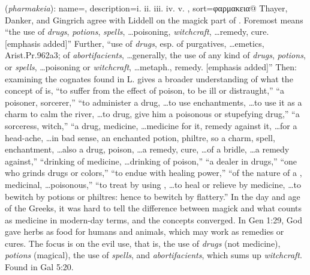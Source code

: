\item[Witchcraft (use of),]

(\textit{pharmakeia}):
{
    name=,
    description={i.  ii.  iii.  iv.  v. },
    sort=φαρμακεια@
}
Thayer, Danker, and Gingrich agree with Liddell on the magick part of . 
Foremost  means ``the use of \emph{drugs}, \emph{potions}, \emph{spells}, \ldots poisoning, \emph{witchcraft}, \ldots remedy, cure. [emphasis added]''
Further, ``use of \emph{drugs}, esp. of purgatives, \ldots emetics, Arist.Pr.962a3; of \emph{abortifacients}, \ldots generally, the use of any kind of \emph{drugs}, \emph{potions}, or \emph{spells}, \ldots poisoning or \emph{witchcraft}, \ldots metaph., remedy. [emphasis added]'' 
Then: examining the cognates found in L. gives a broader understanding of what the concept of  is,  ``to suffer from the effect of poison, to be ill or distraught,''  ``a poisoner, sorcerer,''  ``to administer a drug, \ldots to use enchantments, \ldots to use it as a charm to calm the river, \ldots to drug, give him a poisonous or stupefying drug,''  ``a sorceress, witch,''  ``a drug, medicine, \ldots medicine for it, remedy against it, \ldots for a head-ache, \ldots in bad sense, an enchanted potion, philtre, so a charm, spell, enchantment, \ldots also a drug, poison, \ldots a remedy, cure, \ldots of a bridle, \ldots a remedy against,''  ``drinking of medicine, \ldots drinking of poison,''  ``a dealer in drugs,''  ``one who grinds drugs or colors,''  ``to endue with healing power,''  ``of the nature of a , medicinal, \ldots poisonous,''  ``to treat by using , \ldots to heal or relieve by medicine, \ldots to bewitch by potions or philtres: hence to bewitch by flattery.'' 
In the day and age of the Greeks, it was hard to tell the difference between magick and what counts as medicine in modern-day terms, and the concepts converged. In Gen 1:29, God gave herbs as food for humans and animals, which may work as remedies or cures. The focus is on the evil use, that is, the use of \emph{drugs} (not medicine), \emph{potions} (magical), the use of \emph{spells}, and \emph{abortifacients}, which sums up \emph{witchcraft}.
Found in Gal 5:20.
